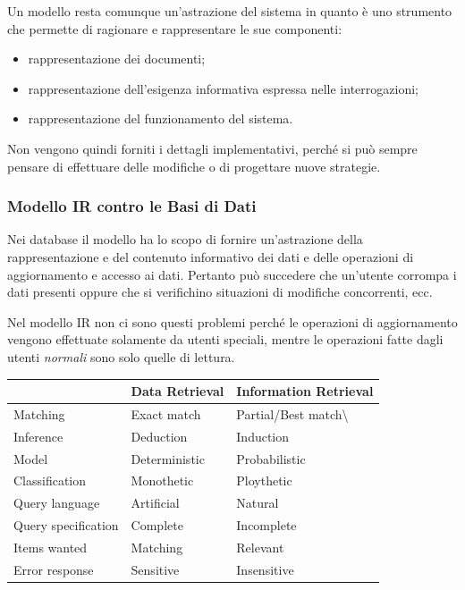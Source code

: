 Un modello resta comunque un'astrazione del sistema in quanto è uno strumento che permette di ragionare e rappresentare le sue componenti:

\begin{itemize}
	\item rappresentazione dei documenti;
	\item rappresentazione dell'esigenza informativa espressa nelle interrogazioni;
	\item rappresentazione del funzionamento del sistema.
\end{itemize}

\noindent Non vengono quindi forniti i dettagli implementativi, perché si può sempre pensare di effettuare delle modifiche o di progettare nuove strategie.

\subsubsection{Modello IR contro le Basi di Dati}

Nei database il modello ha lo scopo di fornire un'astrazione della rappresentazione e del contenuto informativo dei dati e delle operazioni di aggiornamento e accesso ai dati.
Pertanto può succedere che un'utente corrompa i dati presenti oppure che si verifichino situazioni di modifiche concorrenti, ecc.

Nel modello IR non ci sono questi problemi perché le operazioni di aggiornamento vengono effettuate solamente da utenti speciali, mentre le operazioni fatte dagli utenti \textit{normali} sono solo quelle di lettura.

\begin{table}[htbp]
	\centering
	\begin{tabular}{l|l|l|}
		\cline{2-3}
		& Data Retrieval & Information Retrieval            \\ \hline
		\multicolumn{1}{|l|}{Matching}            & Exact match    & Partial/Best match\textbackslash \\ \hline
		\multicolumn{1}{|l|}{Inference}           & Deduction      & Induction                        \\ \hline
		\multicolumn{1}{|l|}{Model}               & Deterministic  & Probabilistic                    \\ \hline
		\multicolumn{1}{|l|}{Classification}      & Monothetic     & Ploythetic                       \\ \hline
		\multicolumn{1}{|l|}{Query language}      & Artificial     & Natural                          \\ \hline
		\multicolumn{1}{|l|}{Query specification} & Complete       & Incomplete                       \\ \hline
		\multicolumn{1}{|l|}{Items wanted}        & Matching       & Relevant                         \\ \hline
		\multicolumn{1}{|l|}{Error response}      & Sensitive      & Insensitive                      \\ \hline
	\end{tabular}
\end{table}


